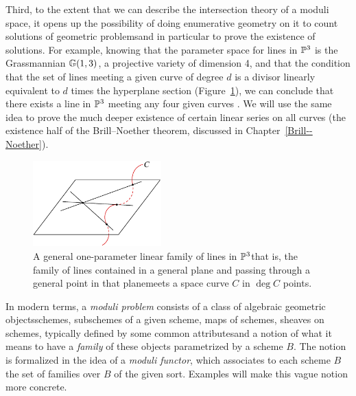 Third, to the extent that we can describe the intersection theory of a
moduli space, it opens up the possibility of doing
enumerative geometry
%
on it to count solutions of geometric problems\emdash and in particular
to prove the existence of solutions. For example, knowing that the
%
parameter space for lines in ${\mathbb P}^3$ is the Grassmannian ${\mathbb G}(1,3)$,
%
a projective variety of dimension 4, and that the condition that the
set of lines meeting a given curve of degree $d$
is a divisor linearly equivalent to  $d$ times the hyperplane section
(Figure~\ref{Chow degree}), we can conclude  that there exists a line
in ${\mathbb P}^3$ meeting any four given curves \cite[Section 3.4.1]{3264}. We
will use the same idea to prove the much deeper existence of certain
linear series on all curves (the existence half of the Brill--Noether
theorem, discussed in Chapter~\ref{Brill--Noether}).

\begin{figure}[b]
\vskip-8pt
\includegraphics[height=1.3in]{"main/Fig06-2"}
 \caption{A general  one-parameter linear family of lines in ${\mathbb P}^3$\emdash that is, the family of lines
 contained in a general plane and passing through a general point in that plane\emdash meets a space curve $C$ in
 $\deg C$ points.}
 \label{Chow degree}
\end{figure}

In modern terms, a \emph{moduli problem}
%
consists of a class of 
\vadjust{\allowbreak}%
algebraic geometric objects\emdash schemes, subschemes of a given scheme,
maps of schemes,
sheaves on schemes, typically defined by some common
attributes\emdash and a notion of what it means to have a \emph{family}
%
of these objects parametrized by a scheme $B$. The notion is formalized
in the idea of a \emph{moduli functor},
%
which associates to each scheme $B$ the set of families over $B$ of the
given sort. Examples will make this vague notion more concrete.


